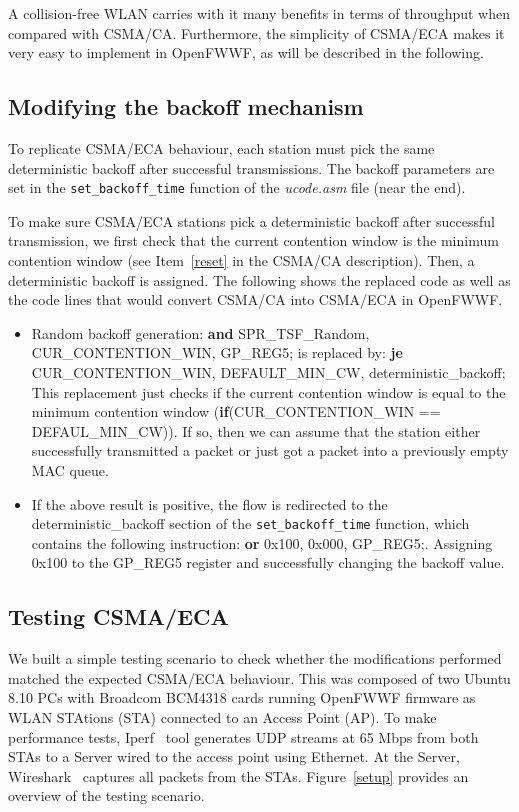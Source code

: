 \documentclass[conference]{IEEEtran}
\begin{document}
A collision-free WLAN carries with it many benefits in terms of throughput when compared with CSMA/CA. Furthermore, the simplicity of CSMA/ECA makes it very easy to implement in OpenFWWF, as will be described in the following.

\subsection{Modifying the backoff mechanism}
To replicate CSMA/ECA behaviour, each station must pick the same deterministic backoff after successful transmissions. The backoff parameters are set in the \texttt{set\_backoff\_time} function of the \emph{ucode.asm} file (near the end).

To make sure CSMA/ECA stations pick a deterministic backoff after successful transmission, we first check that the current contention window is the minimum contention window (see Item~\ref{reset} in the CSMA/CA description). Then, a deterministic backoff is assigned. The following shows the replaced code as well as the code lines that would convert CSMA/CA into CSMA/ECA in OpenFWWF.

\begin{itemize}
	\item Random backoff generation: {\bf and} SPR\_TSF\_Random, CUR\_CONTENTION\_WIN, GP\_REG5; is replaced by: {\bf je} CUR\_CONTENTION\_WIN, DEFAULT\_MIN\_CW, deterministic\_backoff; \\
	This replacement just checks if the current contention window is equal to the minimum contention window ({\bf if}(CUR\_CONTENTION\_WIN == DEFAUL\_MIN\_CW)). If so, then we can assume that the station either successfully transmitted a packet or just got a packet into a previously empty MAC queue.
	\item If the above result is positive, the flow is redirected to the deterministic\_backoff section of the \texttt{set\_backoff\_time} function, which contains the following instruction: {\bf or} 0x100, 0x000, GP\_REG5;. Assigning 0x100 to the GP\_REG5 register and successfully changing the backoff value.
\end{itemize}

\subsection{Testing CSMA/ECA}
We built a simple testing scenario to check whether the modifications performed matched the expected CSMA/ECA behaviour. This was composed of two Ubuntu 8.10 PCs with Broadcom BCM4318 cards running OpenFWWF firmware as WLAN STAtions (STA) connected to an Access Point (AP). To make performance tests, Iperf~\cite{tirumala2005iperf} tool generates UDP streams at 65 Mbps  from both STAs to a Server wired to the access point using Ethernet. At the Server, Wireshark~\cite{combs2007wireshark} captures all packets from the STAs. Figure~\ref{setup} provides an overview of the testing scenario.
\end{document}

